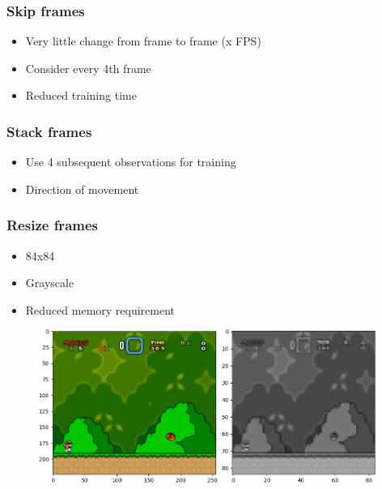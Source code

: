 \documentclass{article}
\begin{document}
    \subsubsection*{Skip frames}
    \begin{itemize}
        \item Very little change from frame to frame (x FPS)
        \item Consider every 4th frame
        \item Reduced training time
    \end{itemize}
    \subsubsection*{Stack frames}
    \begin{itemize}
        \item Use 4 subsequent observations for training
        \item Direction of movement
    \end{itemize}
    \subsubsection*{Resize frames}
    \begin{itemize}
        \item 84x84
        \item Grayscale
        \item Reduced memory requirement
    \end{itemize}
    \begin{figure}[H]
        \centering
        \includegraphics[height=5cm]{original}\hfill
        \includegraphics[height=5cm]{scaled}
    \end{figure}
\end{document}
